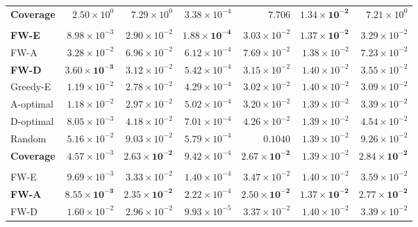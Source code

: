 \documentclass[letterpaper, 9
 pt, conference]{ieeeconf}
\begin{document}
\begin{table}[ht]
\begin{tabular}{lrrrrrr}
\textbf{Coverage} & $2.50\!\times\!10^{0}$ & $7.29\!\times\!10^{0}$ & $3.38\!\times\!10^{-4}$ & $7.706$ & $\mathbf{1.34\!\times\!10^{-2}}$ & $7.21\!\times\!10^{0}$ \\
\addlinespace[1pt]
\multicolumn{7}{l}{\textit{$K{=}10$}} \\[1pt]
\textbf{FW-E} & $8.98\!\times\!10^{-3}$ & $2.90\!\times\!10^{-2}$ & $\mathbf{1.88\!\times\!10^{-4}}$ & $3.03\!\times\!10^{-2}$ & $\mathbf{1.37\!\times\!10^{-2}}$ & $3.29\!\times\!10^{-2}$ \\
FW-A & $3.28\!\times\!10^{-2}$ & $6.96\!\times\!10^{-2}$ & $6.12\!\times\!10^{-4}$ & $7.69\!\times\!10^{-2}$ & $1.38\!\times\!10^{-2}$ & $7.23\!\times\!10^{-2}$ \\
\textbf{FW-D} & $\mathbf{3.60\!\times\!10^{-3}}$ & $3.12\!\times\!10^{-2}$ & $5.42\!\times\!10^{-4}$ & $3.15\!\times\!10^{-2}$ & $1.40\!\times\!10^{-2}$ & $3.55\!\times\!10^{-2}$ \\
Greedy-E & $1.19\!\times\!10^{-2}$ & $2.78\!\times\!10^{-2}$ & $4.29\!\times\!10^{-4}$ & $3.02\!\times\!10^{-2}$ & $1.40\!\times\!10^{-2}$ & $3.09\!\times\!10^{-2}$ \\
A-optimal & $1.18\!\times\!10^{-2}$ & $2.97\!\times\!10^{-2}$ & $5.02\!\times\!10^{-4}$ & $3.20\!\times\!10^{-2}$ & $1.39\!\times\!10^{-2}$ & $3.39\!\times\!10^{-2}$ \\
D-optimal & $8.05\!\times\!10^{-3}$ & $4.18\!\times\!10^{-2}$ & $7.01\!\times\!10^{-4}$ & $4.26\!\times\!10^{-2}$ & $1.39\!\times\!10^{-2}$ & $4.54\!\times\!10^{-2}$ \\
Random & $5.16\!\times\!10^{-2}$ & $9.03\!\times\!10^{-2}$ & $5.79\!\times\!10^{-4}$ & $0.1040$ & $1.39\!\times\!10^{-2}$ & $9.26\!\times\!10^{-2}$ \\
\textbf{Coverage} & $4.57\!\times\!10^{-3}$ & $\mathbf{2.63\!\times\!10^{-2}}$ & $9.42\!\times\!10^{-4}$ & $\mathbf{2.67\!\times\!10^{-2}}$ & $1.39\!\times\!10^{-2}$ & $\mathbf{2.84\!\times\!10^{-2}}$ \\
\addlinespace[1pt]
\multicolumn{7}{l}{\textit{$K{=}15$}} \\[1pt]
FW-E & $9.69\!\times\!10^{-3}$ & $3.33\!\times\!10^{-2}$ & $1.40\!\times\!10^{-4}$ & $3.47\!\times\!10^{-2}$ & $1.40\!\times\!10^{-2}$ & $3.59\!\times\!10^{-2}$ \\
\textbf{FW-A} & $\mathbf{8.55\!\times\!10^{-3}}$ & $\mathbf{2.35\!\times\!10^{-2}}$ & $2.22\!\times\!10^{-4}$ & $\mathbf{2.50\!\times\!10^{-2}}$ & $\mathbf{1.37\!\times\!10^{-2}}$ & $\mathbf{2.77\!\times\!10^{-2}}$ \\
FW-D & $1.60\!\times\!10^{-2}$ & $2.96\!\times\!10^{-2}$ & $9.93\!\times\!10^{-5}$ & $3.37\!\times\!10^{-2}$ & $1.40\!\times\!10^{-2}$ & $3.39\!\times\!10^{-2}$ \\

\end{tabular}
\end{table}
\end{document}
